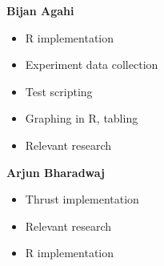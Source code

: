 \documentclass[titlepage, 11pt]{article}
\begin{document}
\textbf{Bijan Agahi}
\begin{itemize}
	\item R implementation
	\item Experiment data collection
	\item Test scripting
	\item Graphing in R, tabling
	\item Relevant research
\end{itemize}

\textbf{Arjun Bharadwaj}
\begin{itemize}
	\item Thrust implementation
	\item Relevant research
	\item R implementation
\end{itemize}
\end{document}
